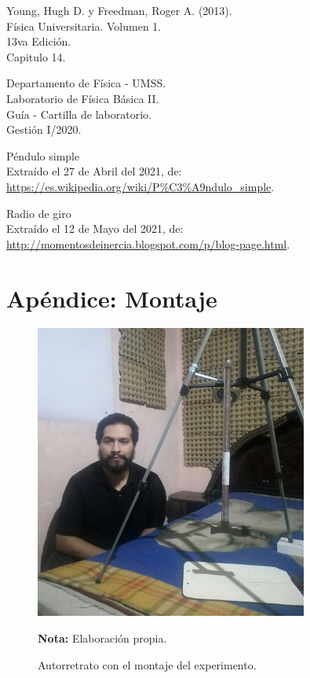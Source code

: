 \documentclass[letter,11pt]{article}
\newcommand{\source}[1]{\vspace{-11pt} \caption*{\small{\textbf{Nota:} {#1}}}}
\begin{document}
\begin{thebibliography}{99}

 Young, Hugh D. y Freedman, Roger A. (2013).\\
Física Universitaria. Volumen 1.\\
13va Edición.\\
Capitulo 14.

 Departamento de Física - UMSS.\\
Laboratorio de Física Básica II.\\
Guía - Cartilla de laboratorio.\\
Gestión I/2020.

 Péndulo simple \\
Extraído el 27 de Abril del 2021, de: \\
\url{https://es.wikipedia.org/wiki/P%C3%A9ndulo_simple}.

 Radio de giro \\
Extraído el 12 de Mayo del 2021, de: \\
\url{http://momentosdeinercia.blogspot.com/p/blog-page.html}.

\end{thebibliography}

\newpage
\section*{Apéndice: Montaje}

\begin{figure}
\centering
\includegraphics[width=0.80\textwidth]{resources/f5.eps}
\caption{Autorretrato con el montaje del experimento.}
\label{figura6}
\source{Elaboración propia.}
\end{figure}
\end{document}

